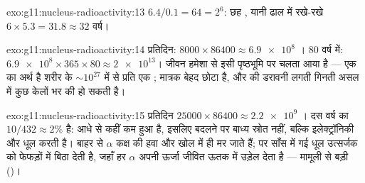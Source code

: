\begin{solution}{exo:g11:nucleus-radioactivity:13}
$6.4/0.1 = 64 = 2^{6}$: छह , यानी ढाल में रखे-रखे $6 \times 5.3 = 31.8 \approx 32$ वर्ष।
\end{solution}

\begin{solution}{exo:g11:nucleus-radioactivity:14}
प्रतिदिन: $8000 \times 86400 \approx \num{6.9e8}$ । $80$ वर्ष में: $\num{6.9e8} \times 365 \times 80 \approx \num{2e13}$। जीवन हमेशा से इसी पृष्ठभूमि
पर चलता आया है --- एक  का अर्थ है शरीर के $\sim 10^{27}$ में से
प्रति  एक ; मात्रक बेहद छोटा है, और
 की डरावनी लगती गिनती असल में कुछ केलों भर की हो सकती है।
\end{solution}

\begin{solution}{exo:g11:nucleus-radioactivity:15}
प्रतिदिन $\num{25000} \times 86400 \approx \num{2.2e9}$ । दस वर्ष  का $10/432 \approx 2\%$ है: आधे से कहीं
कम  हुआ है, इसलिए बदलने पर बाध्य स्रोत नहीं, बल्कि इलेक्ट्रॉनिकी
और धूल करती है। बाहर से $\alpha$ कक्ष की हवा और खोल में ही मर जाते हैं; पर
साँस में गई धूल उत्सर्जक को फेफड़ों में बिठा देती है, जहाँ हर $\alpha$ अपनी
ऊर्जा जीवित ऊतक में उड़ेल देता है --- मामूली  से
बड़ी  ()।
\end{solution}

